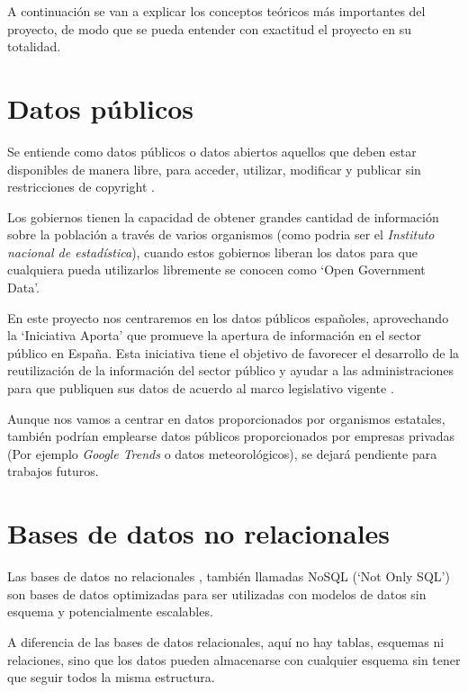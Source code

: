 
A continuación se van a explicar los conceptos teóricos más importantes del proyecto, de modo que se pueda entender con exactitud el proyecto en su totalidad.

\section{Datos públicos}

Se entiende como datos públicos o datos abiertos aquellos que deben estar disponibles de manera libre, para acceder, utilizar, modificar y publicar sin restricciones de copyright \cite{misc:datospublicos}.

Los gobiernos tienen la capacidad de obtener grandes cantidad de información sobre la población a través de varios organismos (como podria ser el \textit{Instituto nacional de estadística}), cuando estos gobiernos liberan los datos para que cualquiera pueda utilizarlos libremente se conocen como `Open Government Data'.

En este proyecto nos centraremos en los datos públicos españoles, aprovechando la `Iniciativa Aporta' que promueve la apertura de información en el sector público en España. Esta iniciativa tiene el objetivo de favorecer el desarrollo de la reutilización de la información del sector público y ayudar a las administraciones para que publiquen sus datos de acuerdo al marco legislativo vigente \cite{misc:iniciativaaporta}.

Aunque nos vamos a centrar en datos proporcionados por organismos estatales, también podrían emplearse datos públicos proporcionados por empresas privadas (Por ejemplo \textit{Google Trends} o datos meteorológicos), se dejará pendiente para trabajos futuros.

\section{Bases de datos no relacionales}

Las bases de datos no relacionales \cite{wiki:nosql}, también llamadas NoSQL (`Not Only SQL') son bases de datos optimizadas para ser utilizadas con modelos de datos sin esquema y potencialmente escalables.

A diferencia de las bases de datos relacionales, aquí no hay tablas, esquemas ni relaciones, sino que los datos pueden almacenarse con cualquier esquema sin tener que seguir todos la misma estructura.

